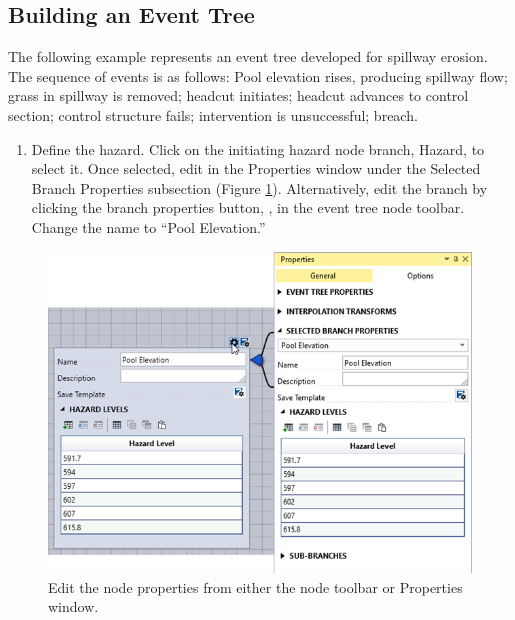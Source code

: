 \documentclass[
]{book}
\providecommand{\tightlist}{%
  \setlength{\itemsep}{0pt}\setlength{\parskip}{0pt}}
\begin{document}
\hypertarget{building-an-event-tree}{%
\subsection{Building an Event Tree}\label{building-an-event-tree}}

The following example represents an event tree developed for spillway erosion. The sequence of events is as follows: Pool elevation rises, producing spillway flow; grass in spillway is removed; headcut initiates; headcut advances to control section; control structure fails; intervention is unsuccessful; breach.

\begin{enumerate}
\def\labelenumi{\arabic{enumi}.}
\tightlist
\item
  Define the hazard. Click on the initiating hazard node branch, Hazard, to select it. Once selected, edit in the Properties window under the Selected Branch Properties subsection (Figure \ref{fig:figure-89}). Alternatively, edit the branch by clicking the branch properties button, , in the event tree node toolbar. Change the name to ``Pool Elevation.''
\end{enumerate}

\begin{figure}

{\centering \includegraphics{images/figure89} 

}

\caption{Edit the node properties from either the node toolbar or Properties window.}\label{fig:figure-89}
\end{figure}
\end{document}
